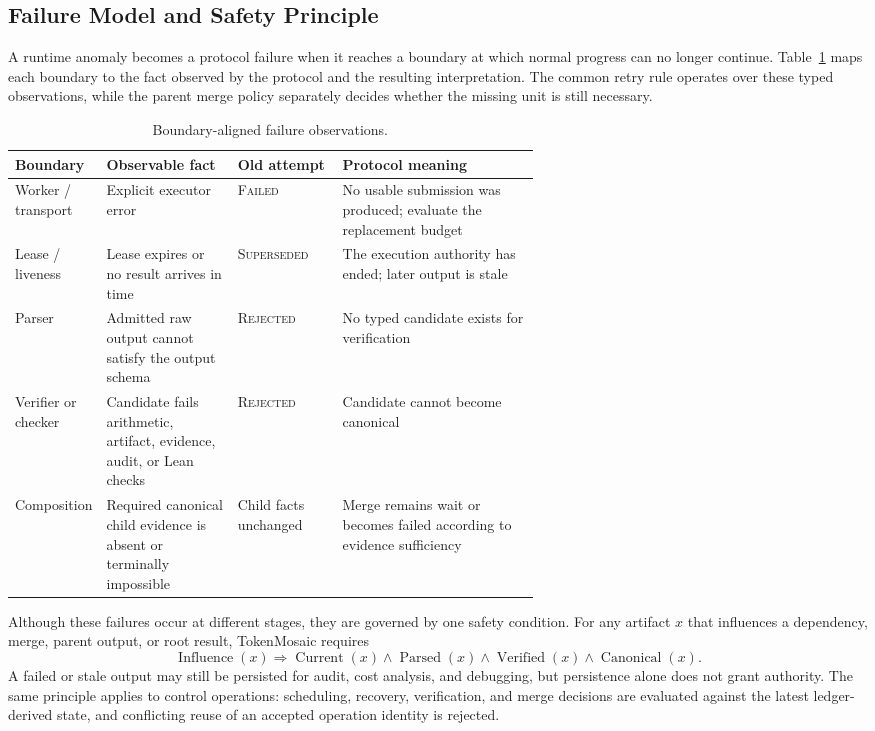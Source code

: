 \documentclass{article}
\theoremstyle{plain}
\begin{document}
\subsection{Failure Model and Safety Principle}
\label{subsec:failure-model}

A runtime anomaly becomes a protocol failure when it reaches a boundary at which normal progress can no longer continue. Table~\ref{tab:failure-boundaries-balanced} maps each boundary to the fact observed by the protocol and the resulting interpretation. The common retry rule operates over these typed observations, while the parent merge policy separately decides whether the missing unit is still necessary.

\begin{table}[!h]
\centering
\scriptsize
\renewcommand{\arraystretch}{1.16}
\caption{Boundary-aligned failure observations.}
\label{tab:failure-boundaries-balanced}
\begin{tabularx}{\linewidth}{@{}p{0.16\linewidth}p{0.25\linewidth}p{0.20\linewidth}X@{}}
\toprule
\textbf{Boundary} & \textbf{Observable fact} & \textbf{Old attempt} & \textbf{Protocol meaning} \\
\midrule
Worker / transport & Explicit executor error & \textsc{Failed} & No usable submission was produced; evaluate the replacement budget \\
Lease / liveness & Lease expires or no result arrives in time & \textsc{Superseded} & The execution authority has ended; later output is stale \\
Parser & Admitted raw output cannot satisfy the output schema & \textsc{Rejected} & No typed candidate exists for verification \\
Verifier or checker & Candidate fails arithmetic, artifact, evidence, audit, or Lean checks & \textsc{Rejected} & Candidate cannot become canonical \\
Composition & Required canonical child evidence is absent or terminally impossible & Child facts unchanged & Merge remains \textsf{wait} or becomes \textsf{failed} according to evidence sufficiency \\
\bottomrule
\end{tabularx}
\end{table}

Although these failures occur at different stages, they are governed by one safety condition. For any artifact $x$ that influences a dependency, merge, parent output, or root result, TokenMosaic requires
\begin{equation}
\operatorname{Influence}(x)
\Rightarrow
\operatorname{Current}(x)
\land
\operatorname{Parsed}(x)
\land
\operatorname{Verified}(x)
\land
\operatorname{Canonical}(x).
\label{eq:failure-safety-balanced}
\end{equation}
A failed or stale output may still be persisted for audit, cost analysis, and debugging, but persistence alone does not grant authority. The same principle applies to control operations: scheduling, recovery, verification, and merge decisions are evaluated against the latest ledger-derived state, and conflicting reuse of an accepted operation identity is rejected.
\end{document}
